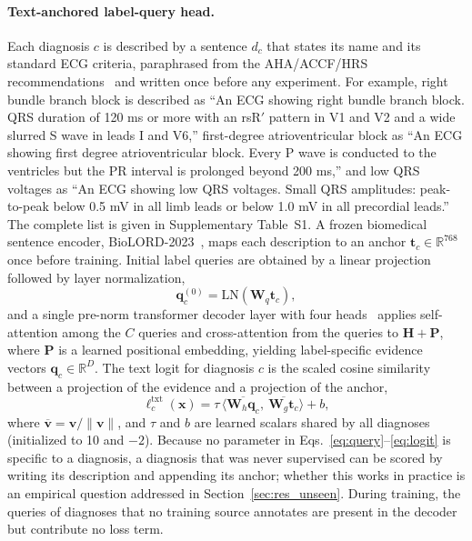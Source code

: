 \paragraph{Text-anchored label-query head.}
Each diagnosis $c$ is described by a sentence $d_c$ that states its name and its standard ECG criteria, paraphrased from the AHA/ACCF/HRS recommendations~\cite{kligfield2007,surawicz2009} and written once before any experiment. For example, right bundle branch block is described as ``An ECG showing right bundle branch block. QRS duration of 120 ms or more with an rsR$'$ pattern in V1 and V2 and a wide slurred S wave in leads I and V6,'' first-degree atrioventricular block as ``An ECG showing first degree atrioventricular block. Every P wave is conducted to the ventricles but the PR interval is prolonged beyond 200 ms,'' and low QRS voltages as ``An ECG showing low QRS voltages. Small QRS amplitudes: peak-to-peak below 0.5 mV in all limb leads or below 1.0 mV in all precordial leads.'' The complete list is given in Supplementary Table~S1. A frozen biomedical sentence encoder, BioLORD-2023~\cite{remy_biolord}, maps each description to an anchor $\mathbf{t}_c\in\mathbb{R}^{768}$ once before training. Initial label queries are obtained by a linear projection followed by layer normalization,
\begin{equation}
\mathbf{q}^{(0)}_c=\mathrm{LN}(\mathbf{W}_q\mathbf{t}_c),
\label{eq:query}
\end{equation}
and a single pre-norm transformer decoder layer with four heads~\cite{liu2021q2l} applies self-attention among the $C$ queries and cross-attention from the queries to $\mathbf{H}+\mathbf{P}$, where $\mathbf{P}$ is a learned positional embedding, yielding label-specific evidence vectors $\mathbf{q}_c\in\mathbb{R}^{D}$. The text logit for diagnosis $c$ is the scaled cosine similarity between a projection of the evidence and a projection of the anchor,
\begin{equation}
\ell^{\mathrm{txt}}_c(\mathbf{x}) = \tau\,\big\langle \overline{\mathbf{W}_h\mathbf{q}_c},\ \overline{\mathbf{W}_g\mathbf{t}_c}\big\rangle + b,
\label{eq:logit}
\end{equation}
where $\overline{\mathbf{v}}=\mathbf{v}/\lVert\mathbf{v}\rVert$, and $\tau$ and $b$ are learned scalars shared by all diagnoses (initialized to 10 and $-2$). Because no parameter in Eqs.~\eqref{eq:query}--\eqref{eq:logit} is specific to a diagnosis, a diagnosis that was never supervised can be scored by writing its description and appending its anchor; whether this works in practice is an empirical question addressed in Section~\ref{sec:res_unseen}. During training, the queries of diagnoses that no training source annotates are present in the decoder but contribute no loss term.

